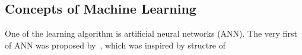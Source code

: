 \subsection{Concepts of Machine Learning}
One of the learning algorithm is artificial neural networks (ANN). The very first of ANN was proposed by~\citet{McCulloch_1943}, which was inspired by structre of 